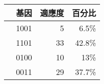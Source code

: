 \begin{tabular}{rrrr}
\toprule
  & 基因 & 適應度 & 百分比  \\
\midrule
  & 1001  & 5  & 6.5\%      \\
  & 1101  & 33  & 42.8\%      \\
  & 0100  & 10  & 13\%      \\
  & 0011  & 29  & 37.7\%      \\
\bottomrule
\end{tabular}

